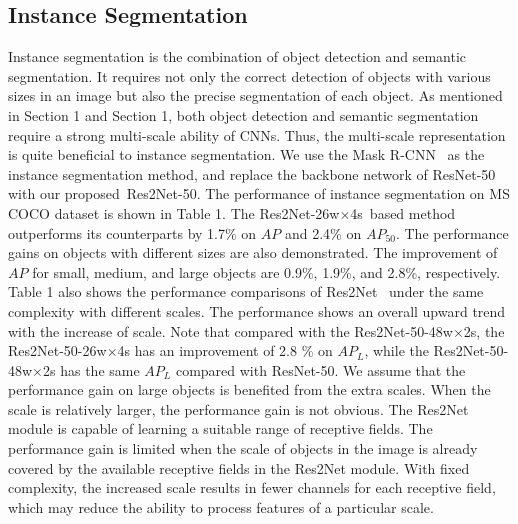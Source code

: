 \documentclass[10pt,journal,cspaper,compsoc]{IEEEtran}
\newcommand{\tabref}[1]{Table 1}%
\newcommand{\secref}[1]{Section 1}
\newcommand{\tabref}[1]{Table~\ref{#1}}%
\newcommand{\secref}[1]{Sec.~\ref{#1}}
\newcommand{\ourM}{{Res2Net}}
\begin{document}
\subsection{Instance Segmentation}

Instance segmentation is the combination of object detection 
and semantic segmentation.
It requires not only the correct detection of objects with various sizes in an image
but also the precise segmentation of each object.
As mentioned in \secref{sec:object_det} and \secref{sec:semantic_seg},
both object detection and semantic segmentation require a strong 
multi-scale ability of CNNs.
Thus, the multi-scale representation is quite beneficial to instance segmentation.
We use the Mask R-CNN~\cite{he2017mask} as the instance segmentation method, 
and replace the backbone network of ResNet-50 with our proposed~\ourM-50.
The performance of instance segmentation on MS COCO \cite{lin2014microsoft} dataset 
is shown in \tabref{tab:instance_segmantation}.
%
The \ourM-26w$\times$4s~based method outperforms its counterparts 
by 1.7$\%$ on $AP$ and 2.4$\%$ on $AP_{50}$.
The performance gains on objects with different sizes are also demonstrated.
The improvement of $AP$ for small, medium, and large objects are 
0.9$\%$, 1.9$\%$, and 2.8$\%$, respectively.
\tabref{tab:instance_segmantation} also shows the performance comparisons of \ourM~ 
under the same complexity with different scales.
The performance shows an overall upward trend  with the increase of scale.
Note that compared with the Res2Net-50-48w$\times$2s, the Res2Net-50-26w$\times$4s
has an improvement of 2.8 $\%$ on $AP_{L}$, while the Res2Net-50-48w$\times$2s 
has the same $AP_{L}$ compared with ResNet-50.
We assume that the performance gain on large objects is benefited from the extra scales.
When the scale is relatively larger, the performance gain is not obvious.
The Res2Net module is capable of learning a suitable range of receptive fields.
The performance gain is limited when the scale of objects in the image
is already covered by the available receptive fields in the Res2Net module.
With fixed complexity, the increased scale results in fewer channels for each receptive field, 
which may reduce the ability to process features of a particular scale.
\end{document}
